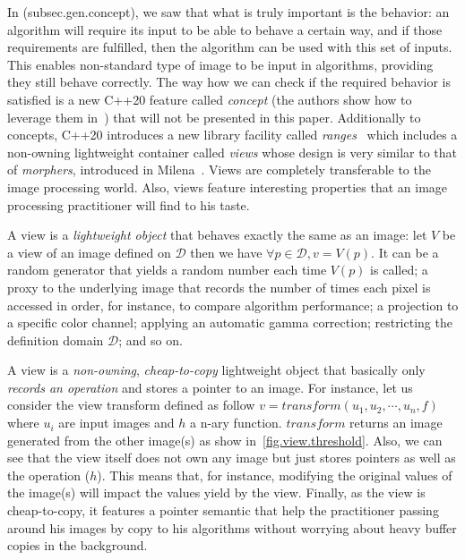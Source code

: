 \vspace{1cm}

In (subsec.gen.concept), we saw that what is truly important is the behavior: an algorithm will require its input
to be able to behave a certain way, and if those requirements are fulfilled, then the algorithm can be used with this
set of inputs. This enables non-standard type of image to be input in algorithms, providing they still behave correctly.
The way how we can check if the required behavior is satisfied is a new C++20 feature called \emph{concept} (the authors
show how to leverage them in~\cite{roynard.2019.rrpr}) that will not be presented in this paper. Additionally to
concepts, C++20 introduces a new library facility called \emph{ranges}~\cite{niebler.2018.deepranges} which includes a
non-owning lightweight container called \emph{views} whose design is very similar to that of \emph{morphers}, introduced
in Milena~\cite{levillain.2009.ismm,geraud.2012.hdr}. Views are completely transferable to the image processing world.
Also, views feature interesting properties that an image processing practitioner will find to his taste.

A view is a \emph{lightweight object} that behaves exactly the same as an image: let $V$ be a view of an image defined
on $\mathcal{D}$ then we have $\forall{p}\in\mathcal{D}, v = V(p)$. It can be a random generator that yields a random
number each time $V(p)$ is called; a proxy to the underlying image that records the number of times each pixel is
accessed in order, for instance, to compare algorithm performance; a projection to a specific color channel; applying an
automatic gamma correction; restricting the definition domain $\mathcal{D}$; and so on.

A view is a \emph{non-owning}, \emph{cheap-to-copy} lightweight object that basically only \emph{records an operation}
and stores a pointer to an image. For instance, let us consider the view transform defined as follow $v = transform(u_1,
  u_2, \cdots, u_n, f)$ where $u_i$ are input images and $h$ a n-ary function. $transform$ returns an image generated from
the other image(s) as show in~\cref{fig.view.threshold}. Also, we can see that the view itself does not own any image
but just stores pointers as well as the operation ($h$). This means that, for instance, modifying the original values of
the image(s) will impact the values yield by the view. Finally, as the view is cheap-to-copy, it features a pointer
semantic that help the practitioner passing around his images by copy to his algorithms without worrying about heavy
buffer copies in the background.

